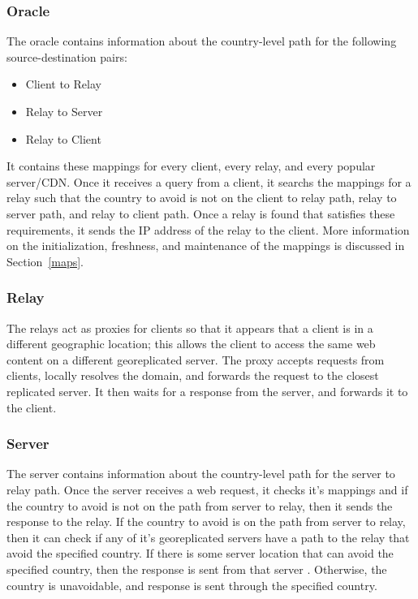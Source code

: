 \subsubsection{Oracle} The oracle contains information about the country-level path for the following source-destination pairs:

\begin{itemize}
\item Client to Relay
\item Relay to Server
\item Relay to Client
\end{itemize}

It contains these mappings for every client, every relay, and every popular server/CDN.  Once it receives a query from a client, it searchs the mappings for a relay such that the country to avoid is not on the client to relay path, relay to server path, and relay to client path.  Once a relay is found that satisfies these requirements, it sends the IP address of the relay to the client.  More information on the initialization, freshness, and maintenance of the mappings is discussed in Section~\ref{maps}.

\subsubsection{Relay} The relays act as proxies for clients so that it appears that a client is in a different geographic location; this allows the client to access the same web content on a different georeplicated server.  The proxy accepts requests from clients, locally resolves the domain, and forwards the request to the closest replicated server.  It then waits for a response from the server, and forwards it to the client.   

\subsubsection{Server}   The server contains information about the country-level path for the server to relay path.  Once the server receives a web request, it checks it's mappings and if the country to avoid is not on the path from server to relay, then it sends the response to the relay.  If the country to avoid is on the path from server to relay, then it can check if any of it's georeplicated servers have a path to the relay that avoid the specified country.  If there is some server location that can avoid the specified country, then the response is sent from that server .  Otherwise, the country is unavoidable, and response is sent through the specified country.


